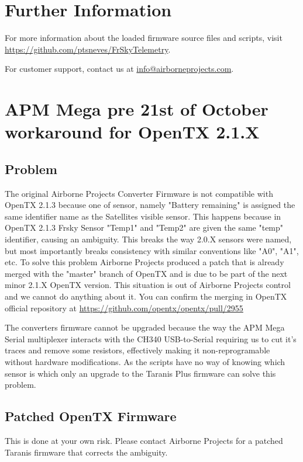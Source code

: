 \documentclass[english]{article}
\begin{document}
\section{Further Information}

For more information about the loaded firmware source files and scripts, visit \url{https://github.com/ptsneves/FrSkyTelemetry}.

For customer support, contact us at \url{info@airborneprojects.com}.

\section{APM Mega pre 21st of October workaround for OpenTX 2.1.X}

\subsection{Problem}

The original Airborne Projects Converter Firmware is not compatible with OpenTX 2.1.3 because one of sensor, namely "Battery remaining" is assigned the same identifier name as the Satellites visible sensor. This happens because in OpenTX 2.1.3 Frsky Sensor "Temp1" and "Temp2" are given the same "temp" identifier, causing an ambiguity. This breaks the way 2.0.X sensors were named, but most importantly breaks consistency with similar conventions like "A0", "A1", etc. To solve this problem Airborne Projects produced a patch that is already merged with the "master" branch of OpenTX and is due to be part of the next minor 2.1.X OpenTX version. This situation is out of Airborne Projects control and we cannot do anything about it. You can confirm the merging in OpenTX official repository at \url{https://github.com/opentx/opentx/pull/2955}

The converters firmware cannot be upgraded because the way the APM Mega Serial multiplexer interacts with the CH340 USB-to-Serial requiring us to cut it's traces and remove some resistors, effectively making it non-reprogramable without hardware modifications. As the scripts have no way of knowing which sensor is which only an upgrade to the Taranis Plus firmware can solve this problem.

\subsection{Patched OpenTX Firmware}

This is done at your own risk. Please contact Airborne Projects for a patched Taranis firmware that corrects the ambiguity.
\end{document}
